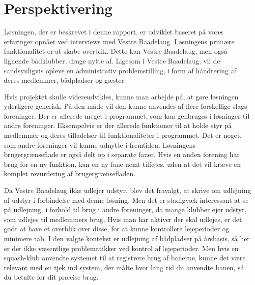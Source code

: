 \chapter{Perspektivering}
\label{cha:perspektivering}

Løsningen, der er beskrevet i denne rapport, er udviklet baseret på vores erfaringer opnået ved interviews med Vestre Baadelaug. Løsningens primære funktionalitet er at skabe overblik. Dette kan Vestre Baadelaug, men også lignende bådklubber, drage nytte af. Ligesom i Vestre Baadelaug, vil de sandsynligvis opleve en administrativ problemstilling, i form af håndtering af deres medlemmer, bådpladser og gæster.

Hvis projektet skulle videreudvikles, kunne man arbejde på, at gøre løsningen yderligere generisk. På den måde vil den kunne anvendes af flere forskellige slags foreninger. Der er allerede meget i programmet, som kan genbruges i løsninger til andre foreninger. Eksempelvis er der allerede funktioner til at holde styr på medlemmer og deres tilladelser til funktionaliteter i programmet. Det er noget, som andre foreninger vil kunne udnytte i fremtiden. Løsningens brugergrænseflade er også delt op i separate faner. Hvis en anden forening har brug for en ny funktion, kan en ny fane nemt tilføjes, uden at det vil kræve en komplet revurdering af brugergrænsefladen.

Da Vestre Baadelaug ikke udlejer udstyr, blev det fravalgt, at skrive om udlejning af udstyr i forbindelse med denne løsning. Men det er stadigvæk interessant at se på udlejning, i forhold til brug i andre foreninger, da mange klubber ejer udstyr, som udlejes til medlemmers brug. Hvis man har aktiver der skal udlejes, er det godt at have et overblik over disse, for at kunne kontrollere lejeperioder og minimere tab. I den valgte kontekst er udlejning af bådpladser på årsbasis, så her er der ikke væsentlige problematikker ved kontrol af lejeperioder. Men hvis en squash-klub anvendte systemet til at registrere brug af banerne, kunne det være relevant med en tjek ind system, der målte hvor lang tid du anvendte banen, så du betalte for dit præcise brug.

